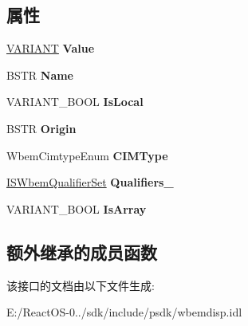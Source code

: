 \subsection*{属性}
\begin{DoxyCompactItemize}
\item 
\mbox{\label{interface_wbem_scripting_1_1_i_s_wbem_property_a78ec844eea7b8727a11ea7e64d349f6e}} 
\hyperlink{structtag_v_a_r_i_a_n_t}{V\+A\+R\+I\+A\+NT} {\bfseries Value}
\item 
\mbox{\label{interface_wbem_scripting_1_1_i_s_wbem_property_a18980f14bacd0c846f326bf67ebef001}} 
B\+S\+TR {\bfseries Name}
\item 
\mbox{\label{interface_wbem_scripting_1_1_i_s_wbem_property_ab67ef92036ccf8df4fa1198e73bd4e63}} 
V\+A\+R\+I\+A\+N\+T\+\_\+\+B\+O\+OL {\bfseries Is\+Local}
\item 
\mbox{\label{interface_wbem_scripting_1_1_i_s_wbem_property_a23361885ca4c5ac91e171a61c85f4e6c}} 
B\+S\+TR {\bfseries Origin}
\item 
\mbox{\label{interface_wbem_scripting_1_1_i_s_wbem_property_a651588c5860cfdf59e8f0c5d1247fb65}} 
Wbem\+Cimtype\+Enum {\bfseries C\+I\+M\+Type}
\item 
\mbox{\label{interface_wbem_scripting_1_1_i_s_wbem_property_a4b440a5cae9229efc9bb1fee993b40b4}} 
\hyperlink{interface_wbem_scripting_1_1_i_s_wbem_qualifier_set}{I\+S\+Wbem\+Qualifier\+Set} {\bfseries Qualifiers\+\_\+}
\item 
\mbox{\label{interface_wbem_scripting_1_1_i_s_wbem_property_a12f7afc99e833613820d8c9ec77fb5fb}} 
V\+A\+R\+I\+A\+N\+T\+\_\+\+B\+O\+OL {\bfseries Is\+Array}
\end{DoxyCompactItemize}
\subsection*{额外继承的成员函数}


该接口的文档由以下文件生成\+:\begin{DoxyCompactItemize}
\item 
E\+:/\+React\+O\+S-\/0../sdk/include/psdk/wbemdisp.\+idl\end{DoxyCompactItemize}
